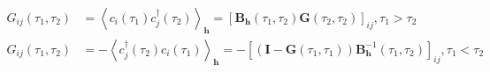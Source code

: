 \begin{equation}
\begin{split}
G_{ij} ( \tau_1 , \tau_2 ) &= \left\langle  c_i ( \tau_1 ) c_j^\dagger ( \tau_2 ) \right\rangle_{\bm h} = [ \bm B_{\bm h} (\tau_1, \tau_2 ) \bm G (\tau_2, \tau_2 ) ]_{ij} , \tau_1 > \tau_2 \\
G_{ij} ( \tau_1 , \tau_2 ) &= -\left\langle  c_j^\dagger ( \tau_2 ) c_i ( \tau_1 )  \right\rangle_{\bm h} = - [ ( \bm I - \bm G (\tau_1, \tau_1 ) ) \bm B_{\bm h}^{-1} (\tau_1, \tau_2 ) ]_{ij} , \tau_1 < \tau_2
\end{split}
\end{equation}